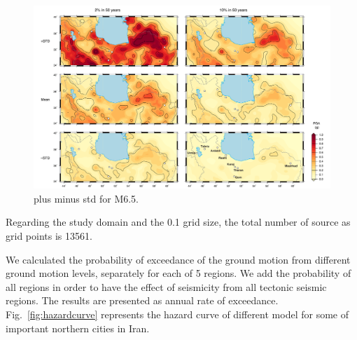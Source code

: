 \begin{figure}[t]
    \centering
    \includegraphics[width=\textwidth]{figures/pdf/figure-10.pdf} 
    \caption{plus minus std for M6.5.}
    \label{fig:pga}
\end{figure}

Regarding the study domain and the 0.1 grid size, the total number of source as grid points is 13561. 


We calculated the probability of exceedance of the ground motion from different ground motion levels, separately for each of 5 regions. We add the probability of all regions in order to have the effect of seismicity from all tectonic seismic regions. The results are presented as annual rate of exceedance. Fig.~\ref{fig:hazardcurve} represents the hazard curve of different model for some of important northern cities in Iran. 

